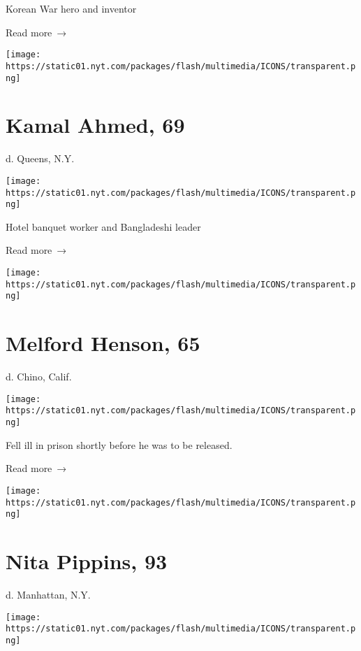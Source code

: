 Korean War hero and inventor

 Read more~→

\href{https://www.nytimes.com/2020/05/20/nyregion/kamal-ahmed-dead-coronavirus.html}{}

\texttt{[image: https://static01.nyt.com/packages/flash/multimedia/ICONS/transparent.png]}

\hypertarget{kamal-ahmed-69}{%
\section{Kamal Ahmed, 69}\label{kamal-ahmed-69}}

d. Queens, N.Y.

\texttt{[image: https://static01.nyt.com/packages/flash/multimedia/ICONS/transparent.png]}

Hotel banquet worker and Bangladeshi leader

 Read more~→

\href{https://www.nytimes.com/2020/05/19/obituaries/melford-henson-dead-coronavirus.html}{}

\texttt{[image: https://static01.nyt.com/packages/flash/multimedia/ICONS/transparent.png]}

\hypertarget{melford-henson-65}{%
\section{Melford Henson, 65}\label{melford-henson-65}}

d. Chino, Calif.

\texttt{[image: https://static01.nyt.com/packages/flash/multimedia/ICONS/transparent.png]}

Fell ill in prison shortly before he was to be released.

 Read more~→

\href{https://www.nytimes.com/2020/05/19/obituaries/nita-pippins-dead-coronavirus.html}{}

\texttt{[image: https://static01.nyt.com/packages/flash/multimedia/ICONS/transparent.png]}

\hypertarget{nita-pippins-93}{%
\section{Nita Pippins, 93}\label{nita-pippins-93}}

d. Manhattan, N.Y.

\texttt{[image: https://static01.nyt.com/packages/flash/multimedia/ICONS/transparent.png]}

